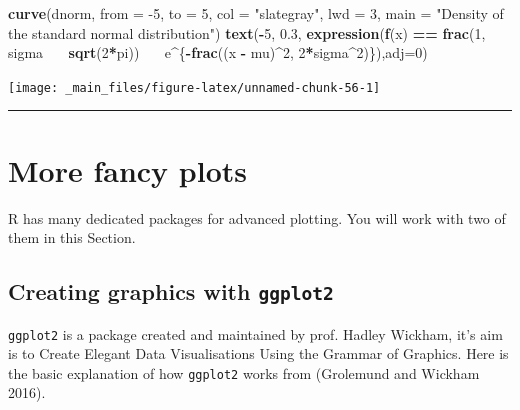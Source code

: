 \documentclass[
]{book}
\newenvironment{Shaded}{\begin{snugshade}}{\end{snugshade}}
\newcommand{\DataTypeTok}[1]{\textcolor[rgb]{0.13,0.29,0.53}{#1}}
\newcommand{\DecValTok}[1]{\textcolor[rgb]{0.00,0.00,0.81}{#1}}
\newcommand{\ErrorTok}[1]{\textcolor[rgb]{0.64,0.00,0.00}{\textbf{#1}}}
\newcommand{\FloatTok}[1]{\textcolor[rgb]{0.00,0.00,0.81}{#1}}
\newcommand{\KeywordTok}[1]{\textcolor[rgb]{0.13,0.29,0.53}{\textbf{#1}}}
\newcommand{\NormalTok}[1]{#1}
\newcommand{\OperatorTok}[1]{\textcolor[rgb]{0.81,0.36,0.00}{\textbf{#1}}}
\newcommand{\StringTok}[1]{\textcolor[rgb]{0.31,0.60,0.02}{#1}}
\begin{document}
\begin{Shaded}
\begin{Highlighting}[]
\KeywordTok{curve}\NormalTok{(dnorm, }\DataTypeTok{from =} \DecValTok{-5}\NormalTok{, }\DataTypeTok{to =} \DecValTok{5}\NormalTok{, }\DataTypeTok{col =} \StringTok{"slategray"}\NormalTok{, }\DataTypeTok{lwd =} \DecValTok{3}\NormalTok{, }\DataTypeTok{main =} \StringTok{"Density of the standard normal distribution"}\NormalTok{)}
\KeywordTok{text}\NormalTok{(}\OperatorTok{-}\DecValTok{5}\NormalTok{, }\FloatTok{0.3}\NormalTok{, }\KeywordTok{expression}\NormalTok{(}\KeywordTok{f}\NormalTok{(x) }\OperatorTok{==}\StringTok{ }\KeywordTok{frac}\NormalTok{(}\DecValTok{1}\NormalTok{, sigma }\OperatorTok{~}\ErrorTok{~}\StringTok{ }\KeywordTok{sqrt}\NormalTok{(}\DecValTok{2}\OperatorTok{*}\NormalTok{pi)) }\OperatorTok{~}\ErrorTok{~}\StringTok{ }\NormalTok{e}\OperatorTok{^}\NormalTok{\{}\OperatorTok{-}\KeywordTok{frac}\NormalTok{((x }\OperatorTok{-}\StringTok{ }\NormalTok{mu)}\OperatorTok{^}\DecValTok{2}\NormalTok{, }\DecValTok{2}\OperatorTok{*}\NormalTok{sigma}\OperatorTok{^}\DecValTok{2}\NormalTok{)\}),}\DataTypeTok{adj=}\DecValTok{0}\NormalTok{)}
\end{Highlighting}
\end{Shaded}

\begin{center}\texttt{[image: \_main\_files/figure-latex/unnamed-chunk-56-1]} \end{center}

\begin{center}\rule{0.5\linewidth}{0.5pt}\end{center}

\hypertarget{more-fancy-plots}{%
\section{More fancy plots}\label{more-fancy-plots}}

R has many dedicated packages for advanced plotting. You will work with two of them in this Section.

\hypertarget{creating-graphics-with-ggplot2}{%
\subsection{\texorpdfstring{Creating graphics with \texttt{ggplot2}}{Creating graphics with ggplot2}}\label{creating-graphics-with-ggplot2}}

\texttt{ggplot2} is a package created and maintained by prof. Hadley Wickham, it's aim is to Create Elegant Data Visualisations Using the Grammar of Graphics. Here is the basic explanation of how \texttt{ggplot2} works from (Grolemund and Wickham 2016).
\end{document}
